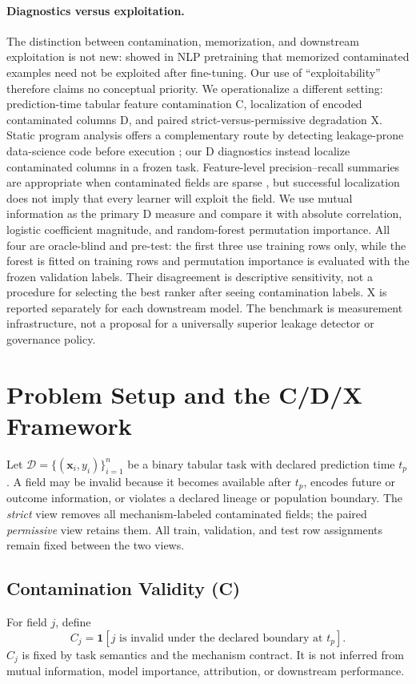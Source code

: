\documentclass[letterpaper]{article}
\begin{document}
\paragraph{Diagnostics versus exploitation.}
The distinction between contamination, memorization, and downstream
exploitation is not new: \citet{magar2022contamination} showed in NLP
pretraining that memorized contaminated examples need not be exploited after
fine-tuning.  Our use of ``exploitability'' therefore claims no conceptual
priority.  We operationalize a different setting: prediction-time tabular
feature contamination C, localization of encoded contaminated columns D, and
paired strict-versus-permissive degradation X.  Static program analysis offers
a complementary route by detecting leakage-prone data-science code before
execution \citep{subotic2022static}; our D diagnostics instead localize
contaminated columns in a frozen task.
Feature-level precision--recall summaries are appropriate when contaminated
fields are sparse \citep{saito2015precision}, but successful localization does
not imply that every learner will exploit the field.  We use mutual information
as the primary D measure and compare it with absolute correlation, logistic
coefficient magnitude, and random-forest permutation importance.  All four are
oracle-blind and pre-test: the first three use training rows only, while the
forest is fitted on training rows and permutation importance is evaluated with
the frozen validation labels.  Their disagreement is descriptive sensitivity,
not a procedure for selecting the best ranker after seeing contamination
labels.  X is reported separately for each downstream model.  The benchmark is measurement
infrastructure, not a proposal for a universally superior leakage detector or
governance policy.

\section{Problem Setup and the C/D/X Framework}
\label{sec:setup}
Let $\mathcal{D}=\{(\mathbf{x}_i,y_i)\}_{i=1}^{n}$ be a binary tabular task
with declared prediction time $t_p$.  A field may be invalid because it becomes
available after $t_p$, encodes future or outcome information, or violates a
declared lineage or population boundary.  The \emph{strict} view removes all
mechanism-labeled contaminated fields; the paired \emph{permissive} view retains
them.  All train, validation, and test row assignments remain fixed between the
two views.

\subsection{Contamination Validity (C)}
For field $j$, define
\begin{equation}
C_j = \mathbf{1}\!\left[j\text{ is invalid under the declared boundary at }t_p\right].
\end{equation}
$C_j$ is fixed by task semantics and the mechanism contract.  It is not inferred
from mutual information, model importance, attribution, or downstream
performance.
\end{document}
